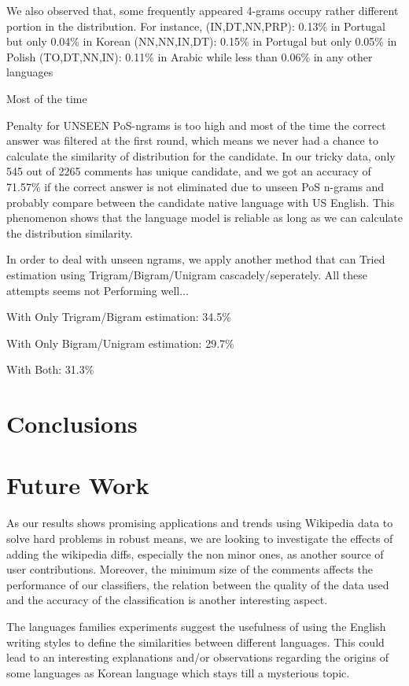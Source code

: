 \documentclass[11pt]{article}
\begin{document}
We also observed that, some frequently appeared 4-grams occupy rather different portion in the distribution. For instance,
(IN,DT,NN,PRP): 0.13\% in Portugal but only 0.04\% in Korean
(NN,NN,IN,DT): 0.15\% in Portugal but only 0.05\% in Polish
(TO,DT,NN,IN): 0.11\% in Arabic while less than 0.06\% in any other languages

Most of the time 


Penalty for UNSEEN PoS-ngrams is too high and most of the time the correct answer was filtered at the first round, which means we never had a chance to calculate the similarity of distribution for the candidate. In our tricky data, only 545 out of 2265 comments has unique candidate, and we got an accuracy of 71.57\% if the correct answer is not eliminated due to unseen PoS n-grams and probably compare between the candidate native language with US English. This phenomenon shows that the language model is reliable as long as we can calculate the distribution similarity.

In order to deal with unseen ngrams, we apply another method that can 
Tried estimation using Trigram/Bigram/Unigram
cascadely/seperately.
All these attempts seems not Performing well...
 
With Only Trigram/Bigram estimation: 34.5\%
 
With Only Bigram/Unigram estimation: 29.7\%
 
With Both: 31.3\%




\section{Conclusions}


\section{Future Work}
As our results shows promising applications and trends using Wikipedia data to solve hard problems in robust means, we are looking to investigate the effects of adding the wikipedia diffs, especially the non minor ones, as another source of user contributions. Moreover, the minimum size of the comments affects the performance of our classifiers, the relation between the quality of the data used and the accuracy of the classification is another interesting aspect.

The languages families experiments suggest the usefulness of using the English writing styles to define the similarities between different languages. This could lead to an interesting explanations and/or observations regarding the origins of some languages as Korean language which stays till a mysterious topic.
\end{document}
